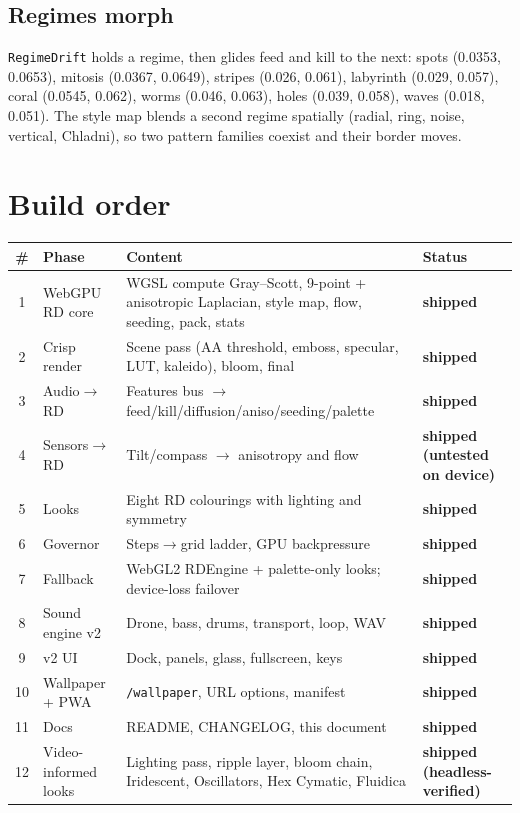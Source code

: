\documentclass[10pt,a4paper]{article}
\newcommand{\code}[1]{\texttt{\small #1}}
\newcommand{\status}[1]{\textsf{\footnotesize\bfseries #1}}
\begin{document}
\subsection{Regimes morph}
\code{RegimeDrift} holds a regime, then glides feed and kill to the next:
spots (0.0353, 0.0653), mitosis (0.0367, 0.0649), stripes (0.026, 0.061), labyrinth
(0.029, 0.057), coral (0.0545, 0.062), worms (0.046, 0.063), holes (0.039, 0.058), waves
(0.018, 0.051). The style map blends a second regime spatially (radial, ring, noise,
vertical, Chladni), so two pattern families coexist and their border moves.

\section{Build order}
\begin{center}\small
\begin{tabularx}{\linewidth}{@{}c l L l@{}}
\toprule
\# & Phase & Content & Status\\
 & WebGPU RD core & WGSL compute Gray--Scott, 9-point + anisotropic Laplacian, style map, flow, seeding, pack, stats & \status{shipped}\\
2 & Crisp render & Scene pass (AA threshold, emboss, specular, LUT, kaleido), bloom, final & \status{shipped}\\
3 & Audio$\to$RD & Features bus $\to$ feed/kill/diffusion/aniso/seeding/palette & \status{shipped}\\
4 & Sensors$\to$RD & Tilt/compass $\to$ anisotropy and flow & \status{shipped (untested on device)}\\
5 & Looks & Eight RD colourings with lighting and symmetry & \status{shipped}\\
6 & Governor & Steps$\to$grid ladder, GPU backpressure & \status{shipped}\\
7 & Fallback & WebGL2 RDEngine + palette-only looks; device-loss failover & \status{shipped}\\
8 & Sound engine v2 & Drone, bass, drums, transport, loop, WAV & \status{shipped}\\
9 & v2 UI & Dock, panels, glass, fullscreen, keys & \status{shipped}\\
10 & Wallpaper + PWA & \code{/wallpaper}, URL options, manifest & \status{shipped}\\
11 & Docs & README, CHANGELOG, this document & \status{shipped}\\
12 & Video-informed looks & Lighting pass, ripple layer, bloom chain, Iridescent, Oscillators, Hex Cymatic, Fluidica & \status{shipped (headless-verified)}\\
\bottomrule
\end{tabularx}\end{center}
\end{document}
